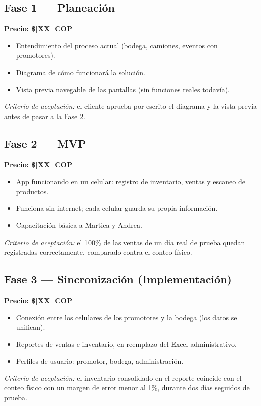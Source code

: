 \documentclass[11pt,a4paper]{article}
\begin{document}
\subsection*{Fase 1 --- Planeación}
\textbf{Precio: \$[XX] COP}
\begin{itemize}
    \item Entendimiento del proceso actual (bodega, camiones, eventos con promotores).
    \item Diagrama de cómo funcionará la solución.
    \item Vista previa navegable de las pantallas (sin funciones reales todavía).
\end{itemize}
\textit{Criterio de aceptación:} el cliente aprueba por escrito el diagrama y la vista previa antes de pasar a la Fase 2.

\subsection*{Fase 2 --- MVP}
\textbf{Precio: \$[XX] COP}
\begin{itemize}
    \item App funcionando en un celular: registro de inventario, ventas y escaneo de productos.
    \item Funciona sin internet; cada celular guarda su propia información.
    \item Capacitación básica a Martica y Andrea.
\end{itemize}
\textit{Criterio de aceptación:} el 100\% de las ventas de un día real de prueba quedan registradas correctamente, comparado contra el conteo físico.

\subsection*{Fase 3 --- Sincronización (Implementación)}
\textbf{Precio: \$[XX] COP}
\begin{itemize}
    \item Conexión entre los celulares de los promotores y la bodega (los datos se unifican).
    \item Reportes de ventas e inventario, en reemplazo del Excel administrativo.
    \item Perfiles de usuario: promotor, bodega, administración.
\end{itemize}
\textit{Criterio de aceptación:} el inventario consolidado en el reporte coincide con el conteo físico con un margen de error menor al 1\%, durante dos días seguidos de prueba.
\end{document}
